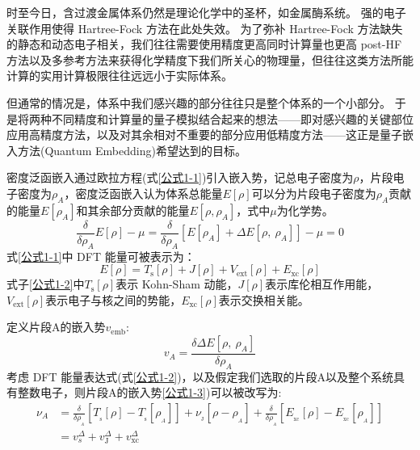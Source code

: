 \documentclass{xmu}
\begin{document}
\tableofcontents

时至今日，含过渡金属体系仍然是理论化学中的圣杯，如金属酶系统\cite{tang2017oxidative}。
强的电子关联作用使得 Hartree-Fock 方法\cite{slater1951simplification}在此处失效。
为了弥补 Hartree-Fock 方法缺失的静态和动态电子相关，我们往往需要使用精度更高同时计算量也更高 post-HF 方法以及多参考方法\cite{mejuto2022effect,weser2021stochastic,dobrautz2021spin}来获得化学精度下我们所关心的物理量，但往往这类方法所能计算的实用计算极限往往远远小于实际体系。

但通常的情况是，体系中我们感兴趣的部分往往只是整个体系的一个小部分。
于是将两种不同精度和计算量的量子模拟结合起来的想法——即对感兴趣的关键部位应用高精度方法，以及对其余相对不重要的部分应用低精度方法——这正是量子嵌入方法(Quantum Embedding)希望达到的目标\cite{sun2016quantum}。

密度泛函嵌入通过欧拉方程(式\ref{公式1-1})引入嵌入势，记总电子密度为$\rho$，片段电子密度为$\rho_A$，密度泛函嵌入认为体系总能量$E[\rho]$可以分为片段电子密度为$\rho_A$贡献的能量$E[\rho_A]$和其余部分贡献的能量$E[\rho,\rho_A]$，式中$\mu$为化学势。
\[\frac{\delta}{\delta\rho_{A}}E[\rho]-\mu=\frac{\delta}{\delta\rho_{A}}[E[\rho_{A}]+\Delta E[\rho,\:\rho_{A}]]-\mu=0
 \tag{公式1-1}\label{公式1-1}\]
式\ref{公式1-1}中 DFT 能量可被表示为：
\[E[\rho]=T_{\mathrm{s}}[\rho]+J[\rho]+V_{\mathrm{ext}}[\rho]+E_{\mathrm{xc}}[\rho] \tag{公式1-2}\label{公式1-2}\]
式子\ref{公式1-2}中$T_{\mathrm{s}}[\rho]$表示 Kohn-Sham 动能，$J[\rho]$表示库伦相互作用能，$V_{\mathrm{ext}}[\rho]$表示电子与核之间的势能，$E_{\mathrm{xc}}[\rho]$表示交换相关能。

定义片段A的嵌入势$v_{\text{emb}}$:
\[v_{A}=\frac{\delta\Delta E[\rho,\:\rho_{A}]}{\delta\rho_{A}} \tag{公式1-3}\label{公式1-3}\]
考虑 DFT 能量表达式(式\ref{公式1-2})，以及假定我们选取的片段A以及整个系统具有整数电子，则片段A的嵌入势\ref{公式1-3})可以被改写为:
\[\begin{aligned}
\nu_{A}& =\frac{\delta}{\delta\rho_{_A}}[T_{_\mathrm{s}}[\rho]-T_{_\mathrm{s}}[\rho_{_A}]]+\nu_{_\mathrm{J}}[\rho-\rho_{_A}]+\frac{\delta}{\delta\rho_{_A}}[E_{_\mathrm{xc}}[\rho]-E_{_\mathrm{xc}}[\rho_{_A}]]  \\
&=v_{s}^{\Delta}+v_{\mathrm{J}}^{\Delta}+v_{\mathrm{xc}}^{\Delta}
\end{aligned} \tag{公式1-4}\label{公式1-4}\]
\end{document}
